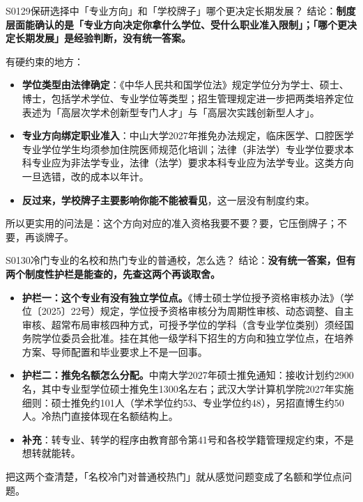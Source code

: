 \begin{qa}{S0129}{保研选择中「专业方向」和「学校牌子」哪个更决定长期发展？}
结论：\textbf{制度层面能确认的是「专业方向决定你拿什么学位、受什么职业准入限制」；「哪个更决定长期发展」是经验判断，没有统一答案。}

有硬约束的地方：
\begin{itemize}
  \item \textbf{学位类型由法律确定}：《中华人民共和国学位法》规定学位分为学士、硕士、博士，包括学术学位、专业学位等类型；招生管理规定进一步把两类培养定位表述为「高层次学术创新型专门人才」与「高层次实践创新型人才」。
  \item \textbf{专业方向绑定职业准入}：中山大学2027年推免办法规定，临床医学、口腔医学专业学位学生均须参加住院医师规范化培训；法律（非法学）专业学位要求本科专业应为非法学专业，法律（法学）要求本科专业应为法学专业。这类方向一旦选错，改的成本以年计。
  \item \textbf{反过来，学校牌子主要影响你能不能被看见}，这一层没有制度约束。
\end{itemize}

所以更实用的问法是：这个方向对应的准入资格我要不要？要，它压倒牌子；不要，再谈牌子。
\end{qa}

\begin{qa}{S0130}{冷门专业的名校和热门专业的普通校，怎么选？}
结论：\textbf{没有统一答案，但有两个制度性护栏是能查的，先查这两个再谈取舍。}

\begin{itemize}
  \item \textbf{护栏一：这个专业有没有独立学位点。}《博士硕士学位授予资格审核办法》（学位〔2025〕22号）规定，学位授予资格审核分为周期性审核、动态调整、自主审核、超常布局审核四种方式，可授予学位的学科（含专业学位类别）须经国务院学位委员会批准。挂在其他一级学科下招生的方向和独立学位点，在培养方案、导师配置和毕业要求上不是一回事。
  \item \textbf{护栏二：推免名额怎么分配。}中南大学2027年硕士推免通知：接收计划约2900名，其中专业型学位硕士推免生1300名左右；武汉大学计算机学院2027年实施细则：硕士推免约101人（学术学位约53、专业学位约48），另招直博生约50人。冷热门直接体现在名额结构上。
  \item \textbf{补充}：转专业、转学的程序由教育部令第41号和各校学籍管理规定约束，不是想转就能转。
\end{itemize}

把这两个查清楚，「名校冷门对普通校热门」就从感觉问题变成了名额和学位点问题。
\end{qa}

